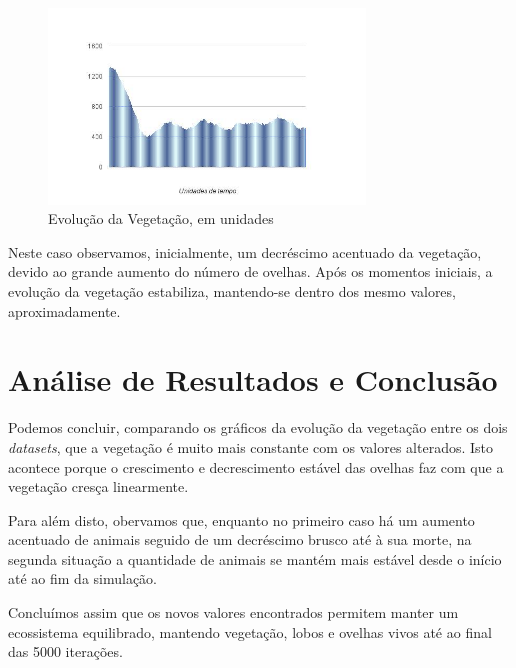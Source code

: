\documentclass[12pt]{article}
\begin{document}
\begin{figure}[H]
  \centering
  \includegraphics[width=0.75\textwidth]{vegetacao2}
  \caption{Evolução da Vegetação, em unidades}
\end{figure}

Neste caso observamos, inicialmente, um decréscimo acentuado da vegetação, devido ao grande aumento do número de ovelhas. Após os momentos iniciais, a evolução da vegetação estabiliza, mantendo-se dentro dos mesmo valores, aproximadamente.

\section*{Análise de Resultados e Conclusão}

Podemos concluir, comparando os gráficos da evolução da vegetação entre os dois
\textit{datasets}, que a vegetação é muito mais constante com os valores alterados.
Isto acontece porque o crescimento e decrescimento estável das ovelhas faz com que a vegetação cresça linearmente.

Para além disto, obervamos que, enquanto no primeiro caso há um aumento acentuado de animais seguido de um decréscimo brusco até à sua morte, na segunda situação a quantidade de animais se mantém mais estável desde o início até ao fim da simulação.

Concluímos assim que os novos valores encontrados permitem manter um ecossistema equilibrado, mantendo vegetação, lobos e ovelhas vivos até ao final das 5000 iterações.
\end{document}
